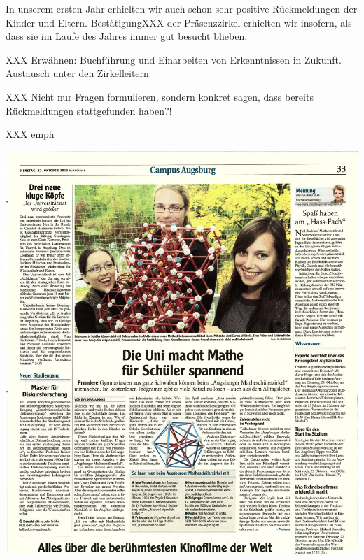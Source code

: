\documentclass[12pt]{zettel}
\begin{document}
In unserem ersten Jahr erhielten wir auch schon sehr positive Rückmeldungen der
Kinder und Eltern. BestätigungXXX der Präsenzzirkel erhielten wir insofern, als
dass sie im Laufe des Jahres immer gut besucht blieben.

XXX Erwähnen: Buchführung und Einarbeiten von Erkenntnissen in Zukunft.
Austausch unter den Zirkelleitern

XXX Nicht nur Fragen formulieren, sondern konkret sagen, dass bereits
Rückmeldungen stattgefunden haben?!

XXX emph

\thispagestyle{empty}
\hspace{-3.5cm}\includegraphics[scale=0.62]{Augsburger-Allgemeine-2013-10-22.jpeg}








\end{document}
